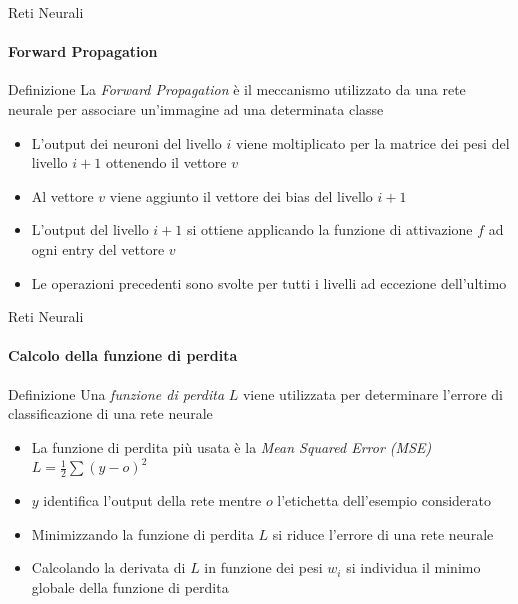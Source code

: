 \documentclass[
 ]{beamer}
\begin{document}
\begin{frame}{Reti Neurali}
    \framesubtitle{Forward Propagation}
    
    \begin{block}{Definizione} 
        \large La \emph{Forward Propagation} è il meccanismo utilizzato da una rete neurale per associare un'immagine ad una determinata classe
    \end{block}\pause
    
    \smallskip
        
    \begin{itemize} [<+->]
        \setlength\itemsep{1em}
        \item \large L'output dei neuroni del livello $i$ viene moltiplicato per la matrice dei pesi del livello $i+1$ ottenendo il vettore $v$
        \item \large Al vettore $v$ viene aggiunto il vettore dei bias del livello $i+1$
        \item \large L'output del livello $i+1$ si ottiene applicando la funzione di attivazione $f$ ad ogni entry del vettore $v$
        \item \large Le operazioni precedenti sono svolte per tutti i livelli ad eccezione dell'ultimo
    \end{itemize}
\end{frame}

\begin{frame}{Reti Neurali}
    \framesubtitle{Calcolo della funzione di perdita}
    
    \begin{block}{Definizione} 
        \large Una \emph{funzione di perdita} $L$ viene utilizzata per determinare l'errore di classificazione di una rete neurale
    \end{block}\pause
        
    \begin{itemize} [<+->]
        \setlength\itemsep{1em}
        \item \large La funzione di perdita più usata è la \emph{Mean Squared Error (MSE)} $L = \frac{1}{2} \sum (y - o)^{2}$
        \item \large $y$ identifica l'output della rete mentre $o$ l'etichetta dell'esempio considerato
        \item \large Minimizzando la funzione di perdita $L$ si riduce l'errore di una rete neurale
        \item \large Calcolando la derivata di $L$ in funzione dei pesi $w_i$ si individua il minimo globale della funzione di perdita
    \end{itemize}
\end{frame}
\end{document}
